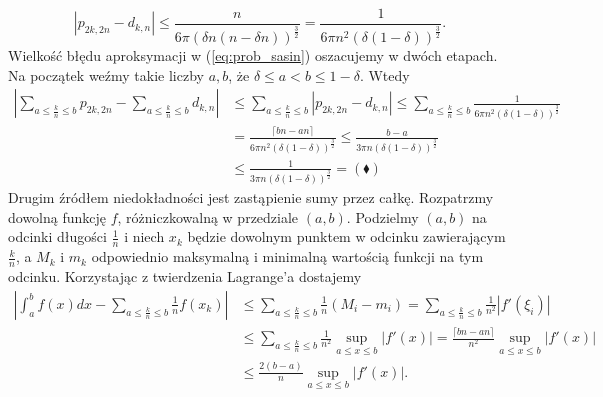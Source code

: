 \documentclass[a4paper,11pt,twoside]{book}
\newcommand{\ceil}[1]{\lceil#1\rceil}
\theoremstyle{definition}
\begin{document}
\[ |p_{2k,2n} - d_{k,n}| \leq \frac{n}{6\pi\left( \delta n (n- \delta n) \right)^{\frac{3}{2}}} = \frac{1}{6\pi n^2 \left( \delta(1- \delta) \right)^{\frac{3}{2}}}.  \]
Wielkość błędu aproksymacji w (\ref{eq:prob_sasin}) oszacujemy w dwóch etapach. Na początek weźmy takie liczby $a,b$, że $\delta \leq a < b \leq 1 - \delta$.
Wtedy
\begin{equation*}
 \begin{split}
  \left| \sum_{a \leq \frac{k}{n} \leq b} p_{2k,2n} -  \sum_{a \leq \frac{k}{n} \leq b}  d_{k,n} \right| &\leq \sum_{a \leq \frac{k}{n} \leq b} \left|  p_{2k,2n} -  d_{k,n} \right| \leq \sum_{a \leq \frac{k}{n} \leq b} \frac{1}{6\pi n^2 \left( \delta(1- \delta) \right)^{\frac{3}{2}}} \\
  &= \frac{\ceil{bn - an}}{6\pi n^2 \left( \delta(1- \delta) \right)^{\frac{3}{2}}} \leq \frac{b - a}{3\pi n \left( \delta(1- \delta) \right)^{\frac{3}{2}}} \\
  &\leq \frac{1}{3\pi n \left( \delta(1- \delta) \right)^{\frac{3}{2}}} = (\blacklozenge)
 \end{split}
\end{equation*}
Drugim źródłem niedokładności jest zastąpienie sumy przez całkę. Rozpatrzmy dowolną funkcję $f$, różniczkowalną w przedziale $(a,b)$. Podzielmy $(a,b)$ na odcinki długości $\frac{1}{n}$ i niech $x_k$ będzie dowolnym punktem w odcinku zawierającym $\frac{k}{n}$, a $M_k$ i $m_k$ odpowiednio maksymalną i minimalną wartością funkcji na tym odcinku. Korzystając z twierdzenia Lagrange'a dostajemy
\begin{equation}
 \begin{split}
    \left| \int_a^b f(x) dx - \sum\limits_{a \leq \frac{k}{n} \leq b}\frac{1}{n}f(x_k) \right| &\leq \sum\limits_{a \leq \frac{k}{n} \leq b}\frac{1}{n}(M_i - m_i) = \sum\limits_{a \leq \frac{k}{n} \leq b}\frac{1}{n^2}|f'(\xi_i)| \\
    &\leq \sum\limits_{a \leq \frac{k}{n} \leq b}\frac{1}{n^2} \sup_{a \leq x \leq b} |f'(x)| = \frac{\ceil{bn-an}}{n^2} \sup_{a \leq x \leq b} |f'(x)| \\
    &\leq \frac{2(b-a)}{n} \sup_{a \leq x \leq b} |f'(x)|.
 \end{split}
\end{equation}
\end{document}

